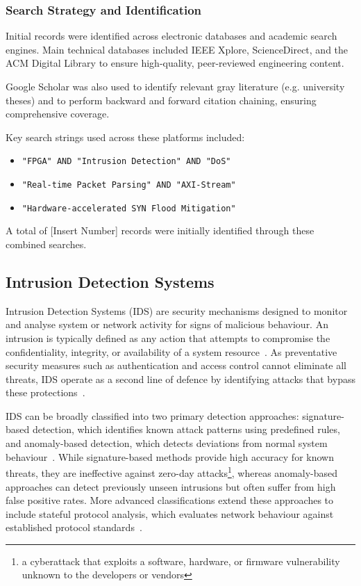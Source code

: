 \subsubsection{Search Strategy and Identification}
Initial records were identified across electronic databases and academic search engines. Main technical databases included IEEE Xplore, ScienceDirect, and the ACM Digital Library to ensure high-quality, peer-reviewed engineering content.

Google Scholar was also used to identify relevant gray literature (e.g. university theses) and to perform backward and forward citation chaining, ensuring comprehensive coverage.

Key search strings used across these platforms included:
\begin{itemize}
  \item \texttt{"FPGA" AND "Intrusion Detection" AND "DoS"}
  \item \texttt{"Real-time Packet Parsing" AND "AXI-Stream"}
  \item \texttt{"Hardware-accelerated SYN Flood Mitigation"}
\end{itemize}

A total of [Insert Number] records were initially identified through these combined searches.

\subsection{Intrusion Detection Systems}
Intrusion Detection Systems (IDS) are security mechanisms designed to monitor and analyse system or network activity for signs of malicious behaviour. An intrusion is typically defined as any action that attempts to compromise the confidentiality, integrity, or availability of a system resource~\cite{biermann_comparison_2001, noauthor_special_nodate}. As preventative security measures such as authentication and access control cannot eliminate all threats, IDS operate as a second line of defence by identifying attacks that bypass these protections~\cite{biermann_comparison_2001, butun_survey_2014}.

IDS can be broadly classified into two primary detection approaches: signature-based detection, which identifies known attack patterns using predefined rules, and anomaly-based detection, which detects deviations from normal system behaviour~\cite{butun_survey_2014, liao_intrusion_2013}. While signature-based methods provide high accuracy for known threats, they are ineffective against zero-day attacks\footnote{a cyberattack that exploits a software, hardware, or firmware vulnerability unknown to the developers or vendors}, whereas anomaly-based approaches can detect previously unseen intrusions but often suffer from high false positive rates. More advanced classifications extend these approaches to include stateful protocol analysis, which evaluates network behaviour against established protocol standards~\cite{liao_intrusion_2013}.

